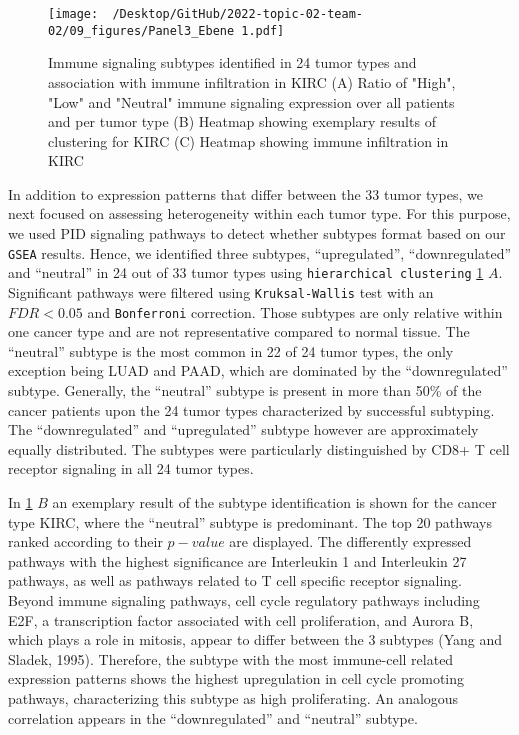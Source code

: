 \documentclass[
  parskip,
  oneside]{scrreprt}
\begin{document}
\begin{figure}
  \texttt{[image: ~/Desktop/GitHub/2022-topic-02-team-02/09\_figures/Panel3\_Ebene 1.pdf]}
  \caption{Immune signaling subtypes identified in 24 tumor types and association with immune infiltration in KIRC (A) Ratio of "High", "Low" and "Neutral" immune signaling expression over all patients and per tumor type (B) Heatmap showing exemplary results of clustering for KIRC (C) Heatmap showing immune infiltration in KIRC}
  \label{pengplot}
\end{figure}

In addition to expression patterns that differ between the 33 tumor
types, we next focused on assessing heterogeneity within each tumor
type. For this purpose, we used PID signaling pathways to detect whether
subtypes format based on our \texttt{GSEA} results. Hence, we identified
three subtypes, ``upregulated'', ``downregulated'' and ``neutral'' in 24
out of 33 tumor types using \texttt{hierarchical\ clustering}
\cref{pengplot} \(A\). Significant pathways were filtered using
\texttt{Kruksal-Wallis} test with an \(FDR < 0.05\) and
\texttt{Bonferroni} correction. Those subtypes are only relative within
one cancer type and are not representative compared to normal tissue.
The ``neutral'' subtype is the most common in 22 of 24 tumor types, the
only exception being LUAD and PAAD, which are dominated by the
``downregulated'' subtype. Generally, the ``neutral'' subtype is present
in more than 50\% of the cancer patients upon the 24 tumor types
characterized by successful subtyping. The ``downregulated'' and
``upregulated'' subtype however are approximately equally distributed.
The subtypes were particularly distinguished by CD8+ T cell receptor
signaling in all 24 tumor types.

In \cref{pengplot} \(B\) an exemplary result of the subtype
identification is shown for the cancer type KIRC, where the ``neutral''
subtype is predominant. The top 20 pathways ranked according to their
\(p-value\) are displayed. The differently expressed pathways with the
highest significance are Interleukin 1 and Interleukin 27 pathways, as
well as pathways related to T cell specific receptor signaling. Beyond
immune signaling pathways, cell cycle regulatory pathways including E2F,
a transcription factor associated with cell proliferation, and Aurora B,
which plays a role in mitosis, appear to differ between the 3 subtypes
(Yang and Sladek, 1995). Therefore, the subtype with the most
immune-cell related expression patterns shows the highest upregulation
in cell cycle promoting pathways, characterizing this subtype as high
proliferating. An analogous correlation appears in the ``downregulated''
and ``neutral'' subtype.
\end{document}
